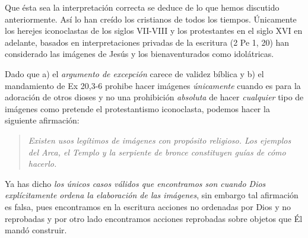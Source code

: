 \documentclass{article}
\begin{document}
Que \'esta sea la interpretaci\'on correcta se deduce de lo que hemos discutido anteriormente. As\'{i} lo han cre\'{i}do los cristianos de todos los tiempos. \'Unicamente los herejes iconoclastas de los siglos VII-VIII y los protestantes en el siglo XVI en adelante, basados en interpretaciones privadas de la escritura (2 Pe 1, 20) han considerado las im\'agenes de Jes\'us y los bienaventurados como idol\'atricas.

Dado que a) el \emph{argumento de excepci\'on} carece de validez b\'{i}blica y b) el mandamiento de Ex 20,3-6 prohibe hacer im\'agenes \emph{\'unicamente} cuando es para la adoraci\'on de otros dioses y no una prohibici\'on \emph{absoluta} de hacer \emph{cualquier} tipo de im\'agenes como pretende el protestantismo iconoclasta, podemos hacer la siguiente afirmaci\'on:

\begin{quote}
\emph{Existen usos leg\'itimos de im\'agenes con prop\'osito religioso. Los ejemplos del Arca, el Templo y la serpiente de bronce constituyen gu\'{i}as de c\'omo hacerlo.}
\end{quote}

\noindent
Ya has dicho \emph{los \'unicos casos v\'alidos que encontramos son cuando Dios expl\'{i}citamente ordena la elaboraci\'on de las im\'agenes}, sin embargo tal afirmaci\'on es falsa, pues encontramos en la escritura acciones no ordenadas por Dios y no reprobadas y por otro lado encontramos acciones reprobadas sobre objetos que \'El mand\'o construir.
\end{document}
